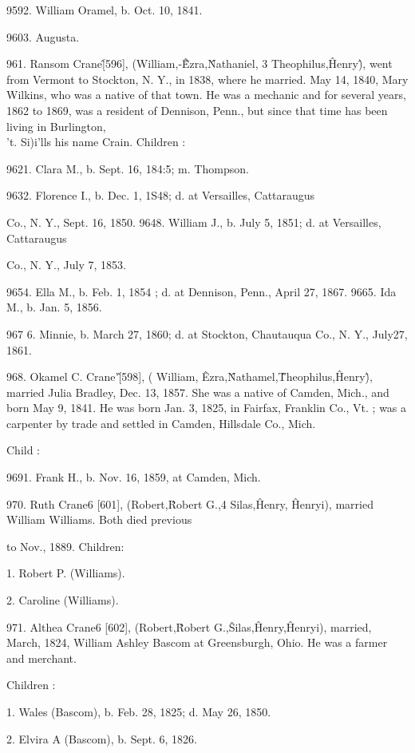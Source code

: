 \documentclass{book}
\begin{document}
9592. William Oramel, b. Oct. 10, 1841. 

9603. Augusta. 

961. Ransom Crane\^ [596], (William,-\^\^ Ezra,\^ Nathaniel, 3 
Theophilus,\^ Henry\^), went from Vermont to Stockton, N. Y., 
in 1838, where he married. May 14, 1840, Mary Wilkins, who 
was a native of that town. He was a mechanic and for several 
years, 1862 to 1869, was a resident of Dennison, Penn., but 
since that time has been living in Burlington, \\'t. Si)i'lls his 
name Crain. Children : 

9621. Clara M., b. Sept. 16, 184:5; m. Thompson. 

9632. Florence I., b. Dec. 1, 1S48; d. at Versailles, Cattaraugus 

Co., N. Y., Sept. 16, 1850. 
9648. William J., b. July 5, 1851; d. at Versailles, Cattaraugus 

Co., N. Y., July 7, 1853. 




9654. Ella M., b. Feb. 1, 1854 ; d. at Dennison, Penn., April 27, 1867. 
9665. Ida M., b. Jan. 5, 1856. 

967  6. Minnie, b. March 27, 1860; d. at Stockton, Chautauqua Co., 
N. Y., July27, 1861. 

968. Okamel C. Crane'\^ [598], ( William, \^ Ezra,\^ Nathamel,\^ 
Theophilus,\^ Henry\^), married Julia Bradley, Dec. 13, 1857. 
She was a native of Camden, Mich., and born May 9, 1841. He 
was born Jan. 3, 1825, in Fairfax, Franklin Co., Vt. ; was a 
carpenter by trade and settled in Camden, Hillsdale Co., Mich. 

Child : 

9691. Frank H., b. Nov. 16, 1859, at Camden, Mich. 

970. Ruth Crane6 [601], (Robert,\^ Robert G.,4 Silas,\^ 
Henry, \^ Henryi), married William Williams. Both died previous 

to Nov., 1889. Children: 

1. Robert P. (Williams). 

2. Caroline (Williams). 

971. Althea Crane6 [602], (Robert,\^ Robert G.,\^ Silas,\^ 
Henry,\^ Henryi), married, March, 1824, William Ashley Bascom 
at Greensburgh, Ohio. He was a farmer and merchant. 

Children : 

1. Wales (Bascom), b. Feb. 28, 1825; d. May 26, 1850. 

2. Elvira A (Bascom), b. Sept. 6, 1826. 
\end{document}

